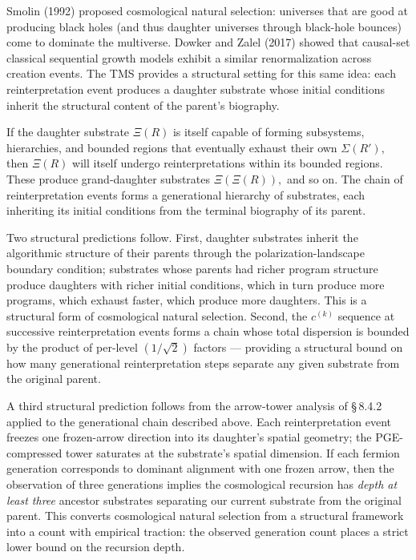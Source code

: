 \documentclass[11pt,oneside]{report}
\theoremstyle{definition}
\theoremstyle{remark}
\begin{document}
Smolin (1992) proposed cosmological natural selection: universes that
are good at producing black holes (and thus daughter universes through
black-hole bounces) come to dominate the multiverse. Dowker and Zalel
(2017) showed that causal-set classical sequential growth models exhibit
a similar renormalization across creation events. The TMS provides a
structural setting for this same idea: each reinterpretation event
produces a daughter substrate whose initial conditions inherit the
structural content of the parent's biography.

If the daughter substrate \ensuremath{\Xi (R)} is itself capable of forming subsystems,
hierarchies, and bounded regions that eventually exhaust their own
\ensuremath{\Sigma (R'),} then \ensuremath{\Xi (R)} will itself undergo reinterpretations within its
bounded regions. These produce grand-daughter substrates \ensuremath{\Xi (\Xi (R)),} and so
on. The chain of reinterpretation events forms a generational hierarchy
of substrates, each inheriting its initial conditions from the terminal
biography of its parent.

Two structural predictions follow. First, daughter substrates inherit
the algorithmic structure of their parents through the
polarization-landscape boundary condition; substrates whose parents had
richer program structure produce daughters with richer initial
conditions, which in turn produce more programs, which exhaust faster,
which produce more daughters. This is a structural form of cosmological
natural selection. Second, the \ensuremath{c^{(k)}} sequence at successive
reinterpretation events forms a chain whose total dispersion is bounded
by the product of per-level \ensuremath{(1/\sqrt{2})} factors --- providing a structural
bound on how many generational reinterpretation steps separate any given
substrate from the original parent.

A third structural prediction follows from the arrow-tower analysis of
\S\,8.4.2 applied to the generational chain described above. Each
reinterpretation event freezes one frozen-arrow direction into its
daughter's spatial geometry; the PGE-compressed tower saturates at the
substrate's spatial dimension. If each fermion generation corresponds to
dominant alignment with one frozen arrow, then the observation of three
generations implies the cosmological recursion has \emph{depth at least
three} ancestor substrates separating our current substrate from the
original parent. This converts cosmological natural selection from a
structural framework into a count with empirical traction: the observed
generation count places a strict lower bound on the recursion depth.
\end{document}
